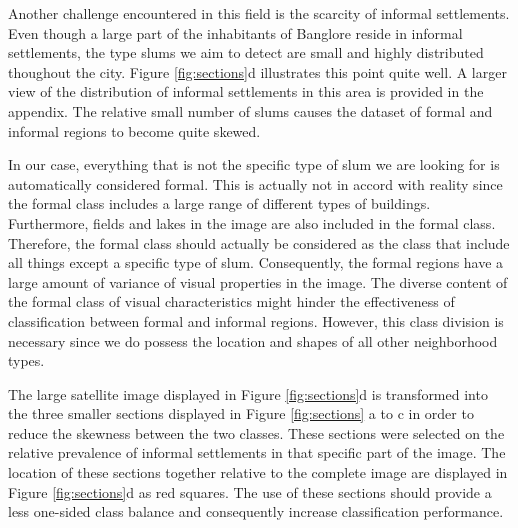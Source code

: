 Another challenge encountered in this field is the scarcity of informal settlements.  Even though a large part of the inhabitants of Banglore reside in informal settlements, the type slums we aim to detect are small and highly distributed thoughout the city. Figure \ref{fig:sections}d illustrates this point quite well. A larger view of the distribution of informal settlements in this area is provided in the appendix. The relative small number of slums causes the dataset of formal and informal regions to become quite skewed.

In our case, everything that is not the specific type of slum we are looking for is automatically considered formal. This is actually not in accord with reality since the formal class includes a large range of different types of buildings. Furthermore, fields and lakes in the image are also included in the formal class. Therefore, the formal class should actually be considered as the class that include all things except a specific type of slum. Consequently, the formal regions have a large amount of variance of visual properties in the image. The diverse content of the formal class of visual characteristics might hinder the effectiveness of classification between formal and informal regions. However, this class division is necessary since we do possess the location and shapes of all other neighborhood types.

The large satellite image displayed in Figure \ref{fig:sections}d is transformed into the three smaller sections displayed in Figure \ref{fig:sections} a to c in order to reduce the skewness between the two classes. These sections were selected on the relative prevalence of informal settlements in that specific part of the image. The location of these sections together relative to the complete image are displayed in Figure \ref{fig:sections}d as red squares. The use of these sections should provide a less one-sided class balance and consequently increase classification performance. 



